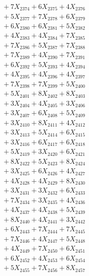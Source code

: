 \documentclass[a4paper,10pt]{article}
\begin{document}
{\begin{align}
&\;  + 7 X_{2374} + 6 X_{2375} + 4 X_{2376} \\[0.3ex]
&\;  + 5 X_{2377} + 7 X_{2378} + 6 X_{2379} \\[0.5ex]\allowbreak
&\;  + 6 X_{2380} + 6 X_{2381} + 5 X_{2382} \\[0.3ex]
&\;  + 4 X_{2383} + 4 X_{2384} + 7 X_{2385} \\[0.3ex]
&\;  + 7 X_{2386} + 5 X_{2387} + 7 X_{2388} \\[0.3ex]
&\;  + 7 X_{2389} + 4 X_{2390} + 7 X_{2391} \\[0.3ex]
&\;  + 6 X_{2392} + 5 X_{2393} + 4 X_{2394} \\[0.3ex]
&\;  + 4 X_{2395} + 4 X_{2396} + 4 X_{2397} \\[0.3ex]
&\;  + 7 X_{2398} + 7 X_{2399} + 5 X_{2400} \\[0.3ex]
&\;  + 5 X_{2401} + 8 X_{2402} + 8 X_{2403} \\[0.3ex]
&\;  + 3 X_{2404} + 4 X_{2405} + 3 X_{2406} \\[0.3ex]
&\;  + 3 X_{2407} + 6 X_{2408} + 5 X_{2409} \\[0.5ex]\allowbreak
&\;  + 3 X_{2410} + 8 X_{2411} + 4 X_{2412} \\[0.3ex]
&\;  + 3 X_{2413} + 5 X_{2414} + 6 X_{2415} \\[0.3ex]
&\;  + 3 X_{2416} + 6 X_{2417} + 6 X_{2418} \\[0.3ex]
&\;  + 5 X_{2419} + 3 X_{2420} + 6 X_{2421} \\[0.3ex]
&\;  + 8 X_{2422} + 5 X_{2423} + 8 X_{2424} \\[0.3ex]
&\;  + 3 X_{2425} + 6 X_{2426} + 4 X_{2427} \\[0.3ex]
&\;  + 4 X_{2428} + 4 X_{2429} + 8 X_{2430} \\[0.3ex]
&\;  + 3 X_{2431} + 3 X_{2432} + 6 X_{2433} \\[0.3ex]
&\;  + 7 X_{2434} + 3 X_{2435} + 4 X_{2436} \\[0.3ex]
&\;  + 4 X_{2437} + 4 X_{2438} + 5 X_{2439} \\[0.5ex]\allowbreak
&\;  + 8 X_{2440} + 4 X_{2441} + 3 X_{2442} \\[0.3ex]
&\;  + 6 X_{2443} + 7 X_{2444} + 7 X_{2445} \\[0.3ex]
&\;  + 7 X_{2446} + 4 X_{2447} + 5 X_{2448} \\[0.3ex]
&\;  + 4 X_{2449} + 7 X_{2450} + 6 X_{2451} \\[0.3ex]
&\;  + 6 X_{2452} + 4 X_{2453} + 6 X_{2454} \\[0.3ex]
&\;  + 5 X_{2455} + 7 X_{2456} + 8 X_{2457} \\[0.3ex]

\end{align}}
\end{document}
